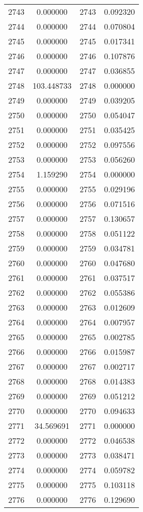 \documentclass[12pt]{article}
\begin{document}
\begin{longtable}{@{}cccc@{}}
2743 & 0.000000 & 2743 & 0.092320 \\
2744 & 0.000000 & 2744 & 0.070804 \\
2745 & 0.000000 & 2745 & 0.017341 \\
2746 & 0.000000 & 2746 & 0.107876 \\
2747 & 0.000000 & 2747 & 0.036855 \\
2748 & 103.448733 & 2748 & 0.000000 \\
2749 & 0.000000 & 2749 & 0.039205 \\
2750 & 0.000000 & 2750 & 0.054047 \\
2751 & 0.000000 & 2751 & 0.035425 \\
2752 & 0.000000 & 2752 & 0.097556 \\
2753 & 0.000000 & 2753 & 0.056260 \\
2754 & 1.159290 & 2754 & 0.000000 \\
2755 & 0.000000 & 2755 & 0.029196 \\
2756 & 0.000000 & 2756 & 0.071516 \\
2757 & 0.000000 & 2757 & 0.130657 \\
2758 & 0.000000 & 2758 & 0.051122 \\
2759 & 0.000000 & 2759 & 0.034781 \\
2760 & 0.000000 & 2760 & 0.047680 \\
2761 & 0.000000 & 2761 & 0.037517 \\
2762 & 0.000000 & 2762 & 0.055386 \\
2763 & 0.000000 & 2763 & 0.012609 \\
2764 & 0.000000 & 2764 & 0.007957 \\
2765 & 0.000000 & 2765 & 0.002785 \\
2766 & 0.000000 & 2766 & 0.015987 \\
2767 & 0.000000 & 2767 & 0.002717 \\
2768 & 0.000000 & 2768 & 0.014383 \\
2769 & 0.000000 & 2769 & 0.051212 \\
2770 & 0.000000 & 2770 & 0.094633 \\
2771 & 34.569691 & 2771 & 0.000000 \\
2772 & 0.000000 & 2772 & 0.046538 \\
2773 & 0.000000 & 2773 & 0.038471 \\
2774 & 0.000000 & 2774 & 0.059782 \\
2775 & 0.000000 & 2775 & 0.103118 \\
2776 & 0.000000 & 2776 & 0.129690 \\

\end{longtable}
\end{document}

